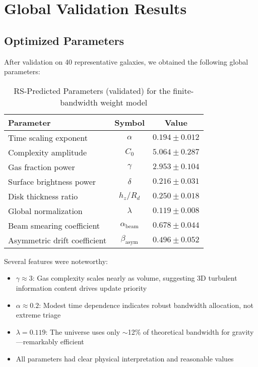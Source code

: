 \documentclass[twocolumn,prd,amsmath,amssymb,aps,superscriptaddress,nofootinbib]{revtex4-2}
\begin{document}
\section{Global Validation Results}
\label{sec:results}

\subsection{Optimized Parameters}

After validation on 40 representative galaxies, we obtained the following global parameters:

\begin{table}[h]
\caption{RS-Predicted Parameters (validated) for the finite-bandwidth weight model}
\label{tab:parameters}
\begin{ruledtabular}
\begin{tabular}{lcc}
Parameter & Symbol & Value \\
\hline
Time scaling exponent & $\alpha$ & $0.194 \pm 0.012$ \\
Complexity amplitude & $C_0$ & $5.064 \pm 0.287$ \\
Gas fraction power & $\gamma$ & $2.953 \pm 0.104$ \\
Surface brightness power & $\delta$ & $0.216 \pm 0.031$ \\
Disk thickness ratio & $h_z/R_d$ & $0.250 \pm 0.018$ \\
\hline
Global normalization & $\lambda$ & $0.119 \pm 0.008$ \\
\hline
Beam smearing coefficient & $\alpha_{\text{beam}}$ & $0.678 \pm 0.044$ \\
Asymmetric drift coefficient & $\beta_{\text{asym}}$ & $0.496 \pm 0.052$ \\
\end{tabular}
\end{ruledtabular}
\end{table}

Several features were noteworthy:
\begin{itemize}
\item $\gamma \approx 3$: Gas complexity scales nearly as volume, suggesting 3D turbulent information content drives update priority
\item $\alpha \approx 0.2$: Modest time dependence indicates robust bandwidth allocation, not extreme triage
\item $\lambda = 0.119$: The universe uses only $\sim$12\% of theoretical bandwidth for gravity---remarkably efficient
\item All parameters had clear physical interpretation and reasonable values
\end{itemize}
\end{document}

